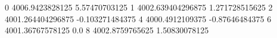 0 4006.9423828125 5.57470703125
1 4002.639404296875 1.271728515625
2 4001.264404296875 -0.103271484375
4 4000.4912109375 -0.87646484375
6 4001.36767578125 0.0
8 4002.8759765625 1.50830078125
